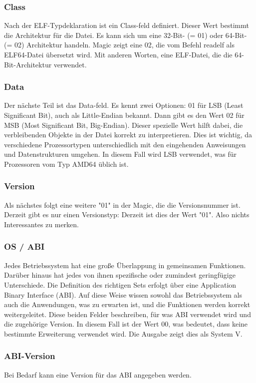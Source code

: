 \subsubsection{Class}
Nach der ELF-Typdeklaration ist ein Class-feld definiert. Dieser Wert bestimmt die Architektur für die Datei. Es kann sich um eine 32-Bit- (= 01) oder 64-Bit- (= 02) Architektur handeln. Magic zeigt eine 02, die vom Befehl readelf als ELF64-Datei übersetzt wird. Mit anderen Worten, eine ELF-Datei, die die 64-Bit-Architektur verwendet.

\subsubsection{Data}
Der nächste Teil ist das Data-feld. Es kennt zwei Optionen: 01 für LSB (Least Significant Bit), auch als Little-Endian bekannt. Dann gibt es den Wert 02 für MSB (Most Significant Bit, Big-Endian). Dieser spezielle Wert hilft dabei, die verbleibenden Objekte in der Datei korrekt zu interpretieren. Dies ist wichtig, da verschiedene Prozessortypen unterschiedlich mit den eingehenden Anweisungen und Datenstrukturen umgehen. In diesem Fall wird LSB verwendet, was für Prozessoren vom Typ AMD64 üblich ist.

\subsubsection{Version}
Als nächstes folgt eine weitere "01" in der Magic, die die Versionsnummer ist. Derzeit gibt es nur einen Versionstyp: Derzeit ist dies der Wert "01". Also nichts Interessantes zu merken.

\subsubsection{OS / ABI}
Jedes Betriebssystem hat eine große Überlappung in gemeinsamen Funktionen. Darüber hinaus hat jedes von ihnen spezifische oder zumindest geringfügige Unterschiede. Die Definition des richtigen Sets erfolgt über eine Application Binary Interface (ABI). Auf diese Weise wissen sowohl das Betriebssystem als auch die Anwendungen, was zu erwarten ist, und die Funktionen werden korrekt weitergeleitet. Diese beiden Felder beschreiben, für was ABI verwendet wird und die zugehörige Version. In diesem Fall ist der Wert 00, was bedeutet, dass keine bestimmte Erweiterung verwendet wird. Die Ausgabe zeigt dies als System V.

\subsubsection{ABI-Version}
Bei Bedarf kann eine Version für das ABI angegeben werden.

